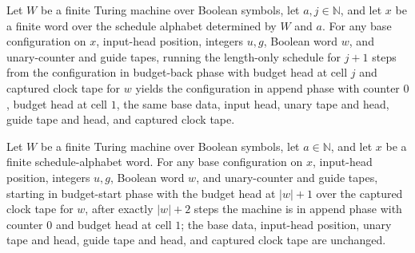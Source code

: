 \begin{lemma}
\label{Complexity.setupCfg_budget_back}
\leanok
{}
Let $W$ be a finite Turing machine over Boolean symbols, let $a,j\in\mathbb{N}$, and let
$x$ be a finite word over the schedule alphabet determined by $W$ and $a$. For any base
configuration on $x$, input-head position, integers $u,g$, Boolean word $w$, and
unary-counter and guide tapes, running the length-only schedule for $j+1$ steps from the
configuration in budget-back phase with budget head at cell $j$ and captured clock tape
for $w$ yields the configuration in append phase with counter $0$, budget head at cell
$1$, the same base data, input head, unary tape and head, guide tape and head, and
captured clock tape.
\end{lemma}

\begin{lemma}
\label{Complexity.setupCfg_budget_start}
\leanok
{}
Let $W$ be a finite Turing machine over Boolean symbols, let $a\in\mathbb{N}$, and let
$x$ be a finite schedule-alphabet word. For any base configuration on $x$, input-head
position, integers $u,g$, Boolean word $w$, and unary-counter and guide tapes, starting
in budget-start phase with the budget head at $|w|+1$ over the captured clock tape for
$w$, after exactly $|w|+2$ steps the machine is in append phase with counter $0$ and
budget head at cell $1$; the base data, input-head position, unary tape and head, guide
tape and head, and captured clock tape are unchanged.
\end{lemma}

